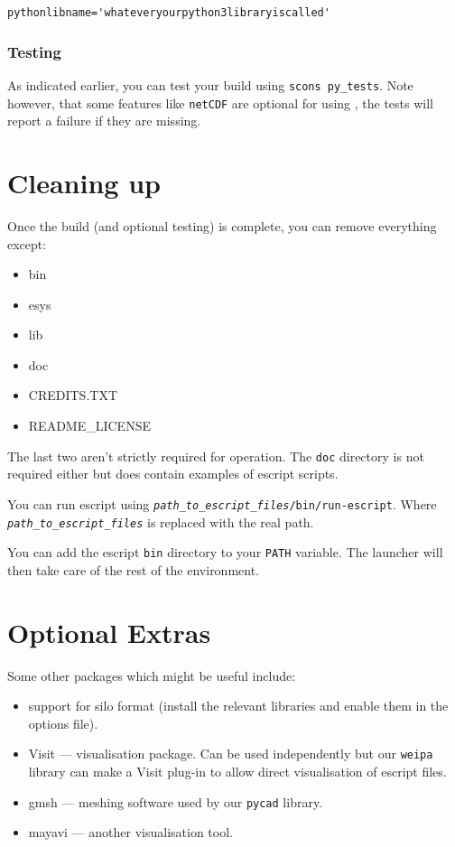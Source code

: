 \begin{verbatim}
pythonlibname='whateveryourpython3libraryiscalled'
\end{verbatim}




\subsubsection{Testing}
As indicated earlier, you can test your build using \texttt{scons py_tests}.
Note however, that some features like \texttt{netCDF} are optional for using \escript, the tests will report a failure if
they are missing.

\section{Cleaning up}
\label{sec:cleanup}

Once the build (and optional testing) is complete, you can remove everything except:
\begin{itemize}
 \item bin
 \item esys
 \item lib
 \item doc
 \item CREDITS.TXT
 \item README_LICENSE
\end{itemize}
The last two aren't strictly required for operation.
The \texttt{doc} directory is not required either but does contain examples of escript scripts.

You can run escript using \texttt{\textit{path_to_escript_files}/bin/run-escript}.
Where \texttt{\textit{path_to_escript_files}} is replaced with the real path.

\begin{optionalstep}
You can add the escript \texttt{bin} directory to your \texttt{PATH} variable.
The launcher will then take care of the rest of the environment.
\end{optionalstep}

\section{Optional Extras}

Some other packages which might be useful include:
\begin{itemize}
 \item support for silo format (install the relevant libraries and enable them in the options file).
 \item Visit --- visualisation package. Can be used independently but our \texttt{weipa} library can make a Visit 
plug-in to allow direct visualisation of escript files.
 \item gmsh --- meshing software used by our \texttt{pycad} library.
 \item mayavi --- another visualisation tool.
\end{itemize}







